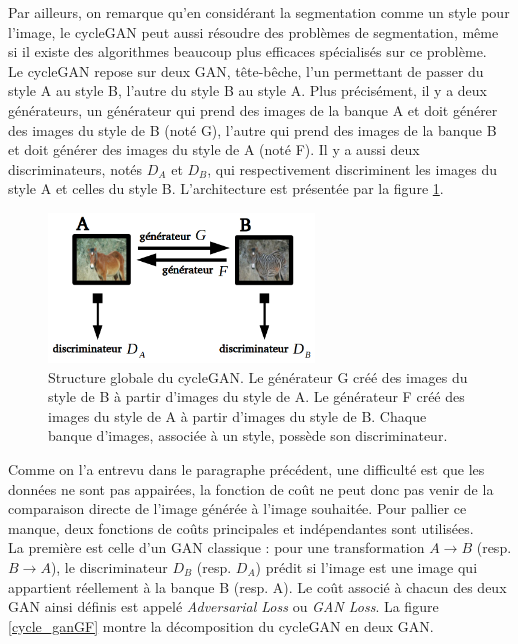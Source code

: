 Par ailleurs, on remarque qu'en considérant la segmentation comme un style pour l'image, le cycleGAN peut aussi résoudre des problèmes de segmentation, même si il existe des algorithmes beaucoup plus efficaces spécialisés sur ce problème.\\

Le cycleGAN repose sur deux GAN, tête-bêche, l'un permettant de passer du style A au style B, l'autre du style B au style A. Plus précisément, il y a deux générateurs, un générateur qui prend des images de la banque A et doit générer des images du style de B (noté G), l'autre qui prend des images de la banque B et doit générer des images du style de A (noté F). Il y a aussi deux discriminateurs, notés $D_A$ et $D_B$, qui respectivement discriminent les images du style A et celles du style B. L'architecture est présentée par la figure \ref{cycleDouble}.

\begin{figure}[!h]
\centering
\includegraphics[width=200pt]{"images/cycle/cycleDouble"}
\caption{Structure globale du cycleGAN. Le générateur G créé des images du style de B à partir d'images du style de A. Le générateur F créé des images du style de A à partir d'images du style de B. Chaque banque d'images, associée à un style, possède son discriminateur.}
\label{cycleDouble}
\end{figure}

Comme on l'a entrevu dans le paragraphe précédent, une difficulté est que les données ne sont pas appairées, la fonction de coût ne peut donc pas venir de la comparaison directe de l'image générée à l'image souhaitée. Pour pallier ce manque, deux fonctions de coûts principales et indépendantes sont utilisées.\\

La première est celle d'un GAN classique : pour une transformation $ A \rightarrow B $ (resp. $ B \rightarrow A $), le discriminateur $ D_B $ (resp. $ D_A $) prédit si l'image est une image qui appartient réellement à la banque B (resp. A). Le coût associé à chacun des deux GAN ainsi définis est appelé \textit{Adversarial Loss} ou \textit{GAN Loss}. La figure \ref{cycle_ganGF} montre la décomposition du cycleGAN en deux GAN. \\

